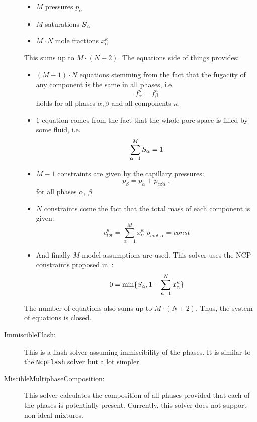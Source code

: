 \begin{description}
  \begin{itemize}
  \item $M$ pressures $p_\alpha$
  \item $M$ saturations $S_\alpha$
  \item $M\cdot N$ mole fractions $x^\kappa_\alpha$
  \end{itemize}
  This sums up to $M\cdot(N + 2)$. The equations side of things
  provides:
  \begin{itemize}
  \item $(M - 1)\cdot N$ equations stemming from the fact that the
    fugacity of any component is the same in all phases, i.e.
    \[
    f^\kappa_\alpha = f^\kappa_\beta
    \]
    holds for all phases $\alpha, \beta$ and all components $\kappa$.
  \item $1$ equation comes from the fact that the whole pore space is
    filled by some fluid, i.e.
    \[
    \sum_{\alpha=1}^M S_\alpha = 1
    \]
  \item $M - 1$ constraints are given by the capillary pressures:
    \[
    p_\beta = p_\alpha + p_{c\beta\alpha} \;,
    \]
    for all phases $\alpha$, $\beta$
  \item $N$ constraints come the fact that the total mass of each
    component is given:
    \[
    c^\kappa_{tot} = \sum_{\alpha=1}^M x_\alpha^\kappa\;\rho_{mol,\alpha} = const
    \]
  \item And finally $M$ model assumptions are used. This solver uses
    the NCP constraints proposed in~\cite{LHHW2011}:
    \[
     0 = \mathrm{min}\{S_\alpha, 1 - \sum_{\kappa=1}^N x_\alpha^\kappa\}
   \]
\end{itemize}
The number of equations also sums up to $M\cdot(N + 2)$. Thus, the
system of equations is closed.
\item[ImmiscibleFlash:] This is a flash solver assuming immiscibility
  of the phases. It is similar to the \texttt{NcpFlash} solver but a
  lot simpler.
\item[MiscibleMultiphaseComposition:] This solver calculates the
  composition of all phases provided that each of the phases is
  potentially present. Currently, this solver does not support
  non-ideal mixtures.
\end{description}
